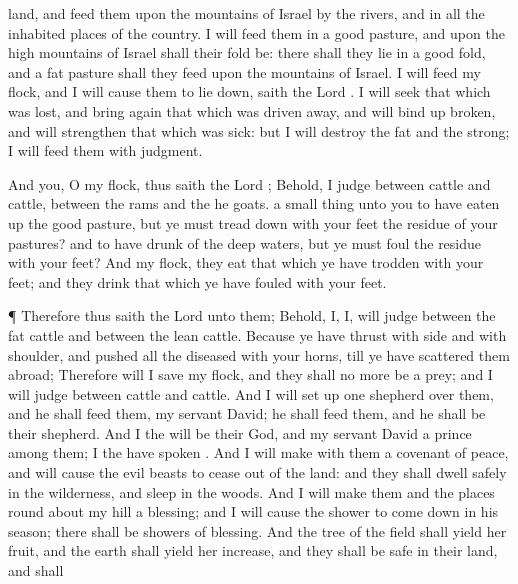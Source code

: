 {land, and
feed them upon the
mountains of
Israel by the
rivers, and in all the inhabited
places of the
country.
I will
feed them in a
good
pasture, and upon the
high
mountains of
Israel shall their
fold be: there shall they
lie in a
good
fold, and
{} a
fat
pasture shall they
feed upon the
mountains of
Israel.
I will
feed my
flock, and I will cause them to lie
down,
saith the
Lord
{}.
I will
seek that which was
lost, and bring
again that which was driven
away, and will bind
up
{}
broken, and will
strengthen that which was
sick: but I will
destroy the
fat and the
strong; I will
feed them with
judgment.
\par }{\PP {}And
{}
you, O my
flock, thus
saith the
Lord
{}; Behold, I
judge between
cattle and
cattle, between the
rams and the he
goats.
 a small
thing unto you to have eaten
up the
good
pasture, but ye must tread
down with your
feet the
residue of your
pastures? and to have
drunk of the
deep
waters, but ye must
foul the
residue with your
feet?
And
{} my
flock, they
eat that which ye have
trodden with your
feet; and they
drink that which ye have
fouled with your
feet.
\par }{\PP {}¶ Therefore thus
saith the
Lord
{} unto them; Behold, I,
{} I, will
judge between the
fat
cattle and between the
lean
cattle.
Because ye have
thrust with
side and with
shoulder, and
pushed all the
diseased with your
horns, till ye have
scattered them
abroad;
Therefore will I
save my
flock, and they shall no more be a
prey; and I will
judge between
cattle and
cattle.
And I will set
up
one
shepherd over them, and he shall
feed them,
{} my
servant
David; he shall
feed them, and he shall be their
shepherd.
And I the
{} will be their
God, and my
servant
David a
prince
among them; I the
{} have
spoken
{}.
And I will
make with them a
covenant of
peace, and will cause the
evil
beasts to
cease out of the
land: and they shall
dwell
safely in the
wilderness, and
sleep in the
woods.
And I will
make them and the places round
about my
hill a
blessing; and I will cause the
shower to come
down in his
season; there shall be
showers of
blessing.
And the
tree of the
field shall
yield her
fruit, and the
earth shall
yield her
increase, and they shall be
safe in their
land, and shall
}
